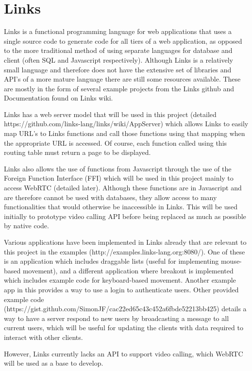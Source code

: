 \documentclass[bsc,frontabs,singlespacing,parskip,deptreport]{infthesis}
\begin{document}
\section{Links}

Links is a functional programming language for web applications that uses a single source code to generate code for all tiers of a web application, as opposed to the more traditional method of using separate languages for database and client (often SQL and Javascript respectively).  Although Links is a relatively small language and therefore does not have the extensive set of libraries and API’s of a more mature language there are still some resources available.  These are mostly in the form of several example projects from the Links github and Documentation found on Links wiki.

Links has a web server model that will be used in this project (detailed https://github.com/links-lang/links/wiki/AppServer) which allows Links to easily map URL’s to Links functions and call those functions using that mapping when the appropriate URL is accessed.  Of course, each function called using this routing table must return a page to be displayed.

Links also allows the use of functions from Javascript through the use of the Foreign Function Interface (FFI) which will be used in this project mainly to access WebRTC (detailed later).  Although these functions are in Javascript and are therefore cannot be used with databases, they allow access to many functionalities that would otherwise be inaccessible in Links.  This will be used initially to prototype video calling API before being replaced as much as possible by native code.

Various applications have been implemented in Links already that are relevant to this project in the examples (http://examples.links-lang.org:8080/).  One of these is an application which includes draggable lists (useful for implementing mouse-based movement), and a different application where breakout is implemented which includes example code for keyboard-based movement.  Another example app in this provides a way to use a login to authenticate users.  Other provided example code (https://gist.github.com/SimonJF/cac22ed65c43c452a6fbde52213bb425) details a way to have a server respond to new users by broadcasting a message to all current users, which will be useful for updating the clients with data required to interact with other clients.

However, Links currently lacks an API to support video calling, which WebRTC will be used as a base to develop.
\end{document}
